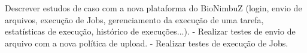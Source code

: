 Descrever estudos de caso com a nova plataforma do BioNimbuZ (login, envio de arquivos, execução de Jobs, gerenciamento da execução de uma tarefa, estatísticas de execução, histórico de execuções...).
-	Realizar testes de envio de arquivo com a nova política de upload.
-	Realizar testes de execução de Jobs.




